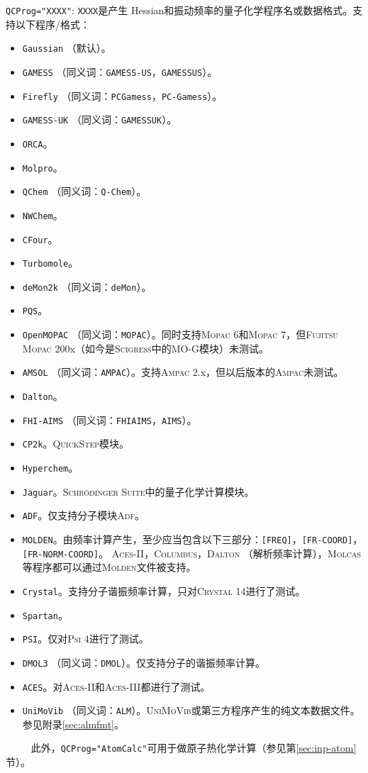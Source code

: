 \documentclass[12pt,a4paper,openany,twoside,cap,UTF8]{ctexbook}
\begin{document}
\bigskip{}
\verb|QCProg="XXXX"|: \verb|XXXX|是产生 Hessian和振动频率的量子化学程序名或数据格式。支持以下程序/格式：
\begin{itemize}
\item \verb|Gaussian| （默认）。
\item \verb|GAMESS| （同义词：\verb|GAMESS-US|，\verb|GAMESSUS|）。
\item \verb|Firefly| （同义词：\verb|PCGamess|，\verb|PC-Gamess|）。
\item \verb|GAMESS-UK| （同义词：\verb|GAMESSUK|）。
\item \verb|ORCA|。
\item \verb|Molpro|。
\item \verb|QChem| （同义词：\verb|Q-Chem|）。
\item \verb|NWChem|。
\item \verb|CFour|。
\item \verb|Turbomole|。
\item \verb|deMon2k| （同义词：\verb|deMon|）。
\item \verb|PQS|。
\item \verb|OpenMOPAC| （同义词：\verb|MOPAC|）。同时支持\textsc{Mopac} 6和\textsc{Mopac} 7，但\textsc{Fujitsu Mopac} 200x（如今是\textsc{Scigress}中的MO-G模块）未测试。
\item \verb|AMSOL| （同义词：\verb|AMPAC|）。支持\textsc{Ampac} 2.x，但以后版本的\textsc{Ampac}未测试。
\item \verb|Dalton|。
\item \verb|FHI-AIMS| （同义词：\verb|FHIAIMS|，\verb|AIMS|）。
\item \verb|CP2k|。\textsc{QuickStep}模块。
\item \verb|Hyperchem|。
\item \verb|Jaguar|。\textsc{Schr\"odinger Suite}中的量子化学计算模块。
\item \verb|ADF|。仅支持分子模块\textsc{Adf}。
\item \verb|MOLDEN|。由频率计算产生，至少应当包含以下三部分：\verb|[FREQ]|，\verb|[FR-COORD]|，\verb|[FR-NORM-COORD]|。 \textsc{Aces-II}，\textsc{Columbus}，\textsc{Dalton} （解析频率计算），\textsc{Molcas}等程序都可以通过\textsc{Molden}文件被支持。
\item \verb|Crystal|。支持分子谐振频率计算，只对\textsc{Crystal} 14进行了测试。
\item \verb|Spartan|。
\item \verb|PSI|。仅对\textsc{Psi} 4进行了测试。
\item \verb|DMOL3| （同义词：\verb|DMOL|）。仅支持分子的谐振频率计算。
\item \verb|ACES|。对\textsc{Aces-II}和\textsc{Aces-III}都进行了测试。
\item \verb|UniMoVib| （同义词：\verb|ALM|）。\textsc{UniMoVib}或第三方程序产生的纯文本数据文件。参见附录\ref{sec:almfmt}。
\end{itemize}
\verb|     |此外，\verb|QCProg="AtomCalc"|可用于做原子热化学计算（参见第\ref{sec:inp-atom}节）。
\end{document}
